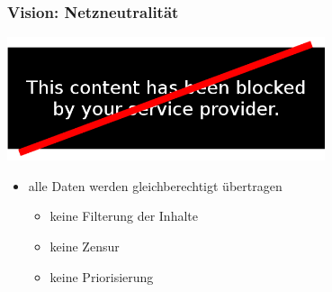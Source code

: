 \documentclass[10pt,handout]{beamer}
\begin{document}
\begin{frame}
	\frametitle{Vision: Netzneutralität}
	\begin{center}
		\includegraphics[width=0.7\textwidth]{images/netneutrality}
	\end{center}
	\begin{itemize}[<+->]
		\item alle Daten werden gleichberechtigt übertragen
		\begin{itemize}[<+->]
			\item keine Filterung der Inhalte
			\item keine Zensur
			\item keine Priorisierung
		\end{itemize}
	\end{itemize}
\end{frame}
\end{document}
